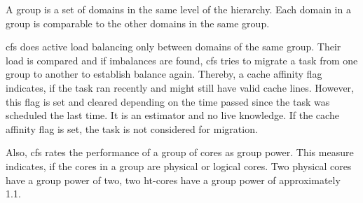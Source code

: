 A group is a set of domains in the same level of the hierarchy.
Each domain in a group is comparable to the other domains in the same group.

\gls{cfs} does active load balancing only between domains of the same group.
Their load is compared and if imbalances are found, \gls{cfs} tries to migrate a task
from one group to another to establish balance again.
Thereby, a cache affinity flag indicates, if the task ran recently and might
still have valid cache lines.
However, this flag is set and cleared depending on the time passed since the
task was scheduled the last time.
It is an estimator and no live knowledge.
If the cache affinity flag is set, the task is not considered for migration.

Also, \gls{cfs} rates the performance of a group of cores as group power.
This measure indicates, if the cores in a group are physical or logical cores.
Two physical cores have a group power of two, two \gls{ht}-cores have
a group power of approximately 1.1.
